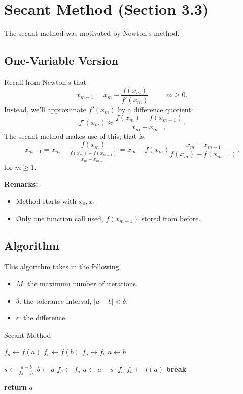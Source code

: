\documentclass[letterpaper]{article}
\begin{document}
\section{Secant Method (Section 3.3)}
The secant method was motivated by Newton's method.

\subsection{One-Variable Version}
Recall from Newton's that \[x_{m + 1} = x_m - \frac{f(x_m)}{f'(x_m)}, \qquad m \geq 0.\]
Instead, we'll approximate $f'(x_m)$ by a difference quotient:
\[f'(x_m) \approx \frac{f(x_m) - f(x_{m - 1})}{x_m - x_{m - 1}}.\]
The secant method makes use of this; that is, 
\[x_{m + 1} = x_{m} - \frac{f(x_m)}{\frac{f(x_m) - f(x_{m - 1})}{x_m - x_{m - 1}}} = x_{m} - f(x_m) \frac{x_m - x_{m - 1}}{f(x_m) - f(x_{m - 1})}.\]
for $m \geq 1$.

\bigskip 

\textbf{Remarks:}
\begin{itemize}
    \item Method starts with $x_0, x_1$
    \item Only one function call used, $f(x_{m - 1})$ stored from before. 
\end{itemize}

\subsection{Algorithm}
This algorithm takes in the following 
\begin{itemize}
    \item $M$: the maximum number of iterations. 
    \item $\delta$: the tolerance interval, $|a - b| < \delta$.
    \item $\epsilon$: the difference.
\end{itemize}
\begin{algorithm}[H]
    \caption{Secant Method}
    \label{alg:two}
    \begin{algorithmic}[1]
            \State $f_a \gets f(a)$
            \State $f_b \gets f(b)$
                    \State $f_a \leftrightarrow f_b$ 
                    \State $a \leftrightarrow b$ 
                \EndIf 
                
                \State $s \gets \frac{a - b}{f_a - f_b}$
                \State $b \gets a$ 
                \State $f_b \gets f_a$ 
                \State $a \gets a - s \cdot f_a$ 
                \State $f_a \gets f(a)$
                    \State \textbf{break}
                \EndIf 
            \EndFor 

            \State \textbf{return} $a$
        \EndFunction
    \end{algorithmic}
\end{algorithm}
\end{document}
